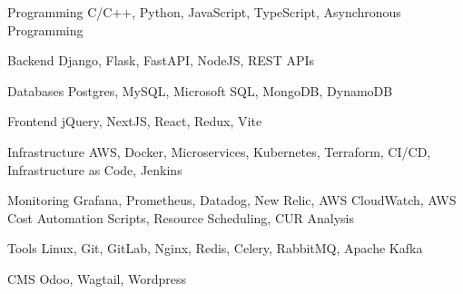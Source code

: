 \vspace{-2mm}


\begin{cvskills}

  \cvskill
    {Programming} %
    {C/C++, Python, JavaScript, TypeScript, Asynchronous Programming} %

  \cvskill
    {Backend} %
    {Django, Flask, FastAPI, NodeJS, REST APIs} %

  \cvskill
    {Databases} %
    {Postgres, MySQL, Microsoft SQL, MongoDB, DynamoDB} %

  \cvskill
    {Frontend} %
    {jQuery, NextJS, React, Redux, Vite} %

  \cvskill
    {Infrastructure} %
    {AWS, Docker, Microservices, Kubernetes, Terraform, CI/CD, Infrastructure as Code, Jenkins} %

  \cvskill
    {Monitoring} %
    {Grafana, Prometheus, Datadog, New Relic, AWS CloudWatch, AWS Cost Automation Scripts, Resource Scheduling, CUR Analysis} %

  \cvskill
    {Tools} %
    {Linux, Git, GitLab, Nginx, Redis, Celery, RabbitMQ, Apache Kafka} %

  \cvskill
    {CMS} %
    {Odoo, Wagtail, Wordpress} %


\end{cvskills}
